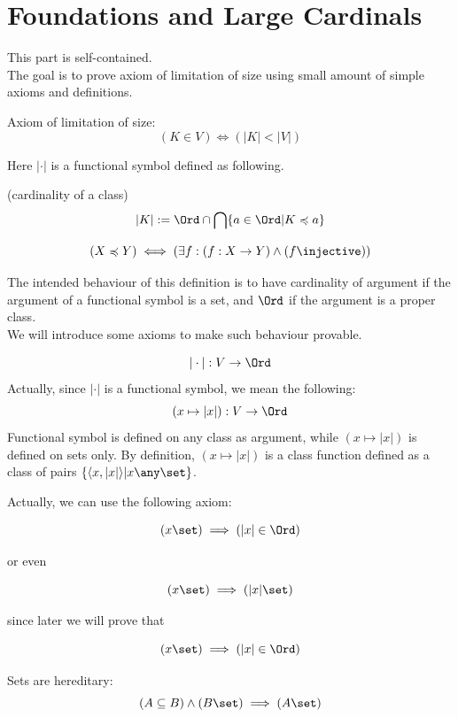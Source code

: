 \def\topic{}


\section{Foundations and Large Cardinals}%
This part is self-contained.\\
The goal is to prove axiom of limitation of size using small amount of simple axioms and definitions.\\
\begin{iaxiom}
Axiom of limitation of size:
\[
(K\in V)
\iff
(|K| < |V|)
\]
\end{iaxiom}


Here $|\cdot|$ is a functional symbol defined as following.
\begin{definition}(cardinality of a class)
\[
|K|:= \Ord \cap \bigcap \{a\in\Ord|K\preccurlyeq a\}
\]
\end{definition}
\begin{definition}
\[
(X\preccurlyeq Y)
\iff
(\exists f: (f:X\to Y)\land (f \injective))
\]
\end{definition}
The intended behaviour of this definition is to have cardinality of argument if the argument of a functional symbol is a set, and $\Ord$ if the argument is a proper class.\\
We will introduce some axioms to make such behaviour provable.\\
\begin{iaxiom}
\[
|\cdot|:V \to \Ord
\]
Actually, since $|\cdot|$ is a functional symbol, we mean the following:
\[
(x\mapsto |x|):V \to \Ord
\]
Functional symbol is defined on any class as argument, while $(x\mapsto |x|)$ is defined on sets only. By definition, $(x\mapsto |x|)$ is a class function defined as a class of pairs $\{\langle x, |x|\rangle | x \any\set\}$.
\end{iaxiom}
Actually, we can use the following axiom:
\begin{axiom*}
\[
(x\set)\implies(|x|\in\Ord)
\]
\end{axiom*}
or even
\begin{axiom*}
\[
(x\set)\implies(|x|\set)
\]
\end{axiom*}
since later we will prove that
\begin{theorem*}
\[
(x\set)\implies(|x|\in\Ord)
\]
\end{theorem*}

\begin{iaxiom} Sets are hereditary:
\[
(A\subseteq B)\land (B\set) \implies (A\set)
\]
\end{iaxiom}


